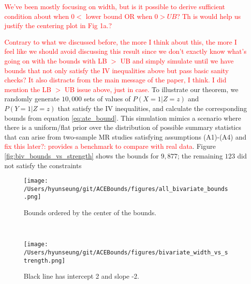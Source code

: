 \documentclass[
]{article}
\theoremstyle{plain}
\begin{document}
\textcolor{red}{We've been mostly focusing on width, but is it possible to derive sufficient condition about when $0 <$ lower bound OR when $0> UB$? Th is would help us justify the centering plot in Fig 1a.?}

\textcolor{red}{Contrary to what we discussed before, the more I think about this, the more I feel like we should avoid discussing this result since we don't exactly know what's going on with the bounds with LB $>$ UB and simply simulate until we have bounds that not only satisfy the IV inequalities above but pass basic sanity checks? It also distracts from the main message of the paper, I think. I did mention the LB $>$ UB issue above, just in case.}
To illustrate our theorem, we randomly generate \(10,000\) sets of values of \(P(X = 1 | Z = z)\) and \(P(Y = 1 | Z = z)\) that satisfy the IV inequalities, and calculate the corresponding bounds from equation \eqref{eq:ate_bound}. This simulation mimics a scenario where there is a uniform/flat prior over the distribution of possible summary statistics that can arise from two-sample MR studies satisfying assumptions (A1)-(A4)  and \textcolor{red}{fix this later?: provides a benchmark to compare with real data}. Figure \ref{fig:biv_bounds_vs_strength} shows the bounds for \(9,877\); the remaining \(123\) did not satisfy the constraints 
\begin{figure*}
  \centering
  \begin{subfigure}[t]{0.5\textwidth}
    \centering
    \texttt{[image: /Users/hyunseung/git/ACEBounds/figures/all\_bivariate\_bounds.png]}
    \caption{Bounds ordered by the center of the bounds.}
    \label{fig:all_biv_bounds}
  \end{subfigure}%
  ~
  \begin{subfigure}[t]{0.5\textwidth}
    \texttt{[image: /Users/hyunseung/git/ACEBounds/figures/bivariate\_width\_vs\_strength.png]}
    \caption{Black line has intercept 2 and slope -2.}
    \label{fig:biv_width_vs_strength}
  \end{subfigure}
  \caption{10,000 values for bivariate distributions were randomly generated such that no constraints were violated. Of these, 123 resulted in bounds where the lower bound was greater than the upper bounds. These have been removed from these plots.}
  \label{fig:biv_bounds_vs_strength}
\end{figure*}
\end{document}
